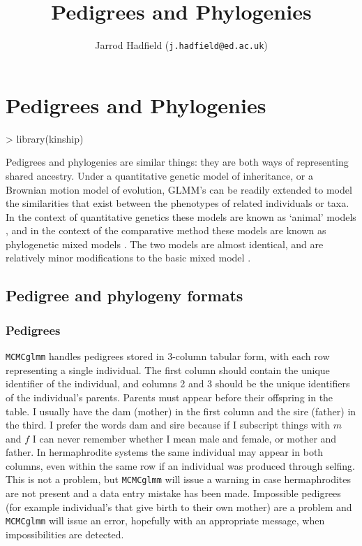 \documentclass{article}
\title{Pedigrees and Phylogenies}
\author{Jarrod Hadfield (\texttt{j.hadfield@ed.ac.uk})}
\begin{document}
\maketitle
\else
\chapter{Pedigrees and Phylogenies}
\label{chap6}
\fi
\begin{Schunk}
\begin{Sinput}
> library(kinship)
\end{Sinput}
\end{Schunk}



Pedigrees and phylogenies are similar things: they are both ways of representing shared ancestry. Under a quantitative genetic model of inheritance, or a Brownian motion model of evolution, GLMM's can be readily extended to model the similarities that exist between the phenotypes of related individuals or taxa.  In the context of quantitative genetics these models are known as `animal' models \citep{Henderson.1976}, and in the context of the comparative method these models are known as phylogenetic mixed models \citep{Lynch.1991}. The two models are almost identical, and are relatively minor modifications to the basic mixed model \citep{Hadfield.2010b}. 


\section{Pedigree and phylogeny formats}

\subsection{Pedigrees}

\texttt{MCMCglmm} handles pedigrees stored in 3-column tabular form, with each row representing a single individual. The first column should contain the unique identifier of the individual, and columns 2 and 3 should be the unique identifiers of the individual's parents. Parents must appear before their offspring in the table. I usually have the dam (mother) in the first column and the sire (father) in the third. I prefer the words dam and sire because if I subscript things with $m$ and $f$ I can never remember whether I mean male and female, or mother and father. In hermaphrodite systems the same individual may appear in both columns, even within the same row if an individual was produced through selfing.  This is not a problem, but \texttt{MCMCglmm} will issue a warning in case hermaphrodites are not present and a data entry mistake has been made. Impossible pedigrees (for example individual's that give birth to their own mother) are a problem and \texttt{MCMCglmm} will issue an error, hopefully with an appropriate message, when impossibilities are detected.\\
\end{document}
